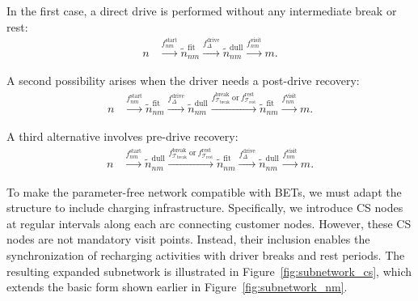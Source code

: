\documentclass[trsc,dblanonrev]{informs4}
\begin{document}
In the first case, a direct drive is performed without any intermediate break or rest:
\begin{align*}
n &\xrightarrow{f^{\text{start}}_{nm}} \tilde{n}^{\text{fit}}_{nm}
\xrightarrow{f^{\text{drive}}_{\Delta}} \tilde{n}^{\text{dull}}_{nm}
\xrightarrow{f^{\text{visit}}_{nm}} m.
\end{align*}

A second possibility arises when the driver needs a post-drive recovery:
\begin{align*}
n &\xrightarrow{f^{\text{start}}_{nm}} \tilde{n}^{\text{fit}}_{nm}
\xrightarrow{f^{\text{drive}}_{\Delta}} \tilde{n}^{\text{dull}}_{nm}
\xrightarrow{f^{\text{break}}_{\mathcal{T}_{\text{break}}}\ \text{or}\ f^{\text{rest}}_{\mathcal{T}_{\text{rest}}}}
\tilde{n}^{\text{fit}}_{nm}
\xrightarrow{f^{\text{visit}}_{nm}} m.
\end{align*}

A third alternative involves pre-drive recovery:
\begin{align*}
n &\xrightarrow{f^{\text{start}}_{nm}} \tilde{n}^{\text{dull}}_{nm}
\xrightarrow{f^{\text{break}}_{\mathcal{T}_{\text{break}}}\ \text{or}\ f^{\text{rest}}_{\mathcal{T}_{\text{rest}}}}
\tilde{n}^{\text{fit}}_{nm}
\xrightarrow{f^{\text{drive}}_{\Delta}} \tilde{n}^{\text{dull}}_{nm}
\xrightarrow{f^{\text{visit}}_{nm}} m.
\end{align*}

To make the parameter-free network compatible with BETs, we must adapt the structure to include charging infrastructure. Specifically, we introduce CS nodes at regular intervals along each arc connecting customer nodes. However, these CS nodes are not mandatory visit points. Instead, their inclusion enables the synchronization of recharging activities with driver breaks and rest periods. The resulting expanded subnetwork is illustrated in Figure~\ref{fig:subnetwork_cs}, which extends the basic form shown earlier in Figure~\ref{fig:subnetwork_nm}.
\end{document}

